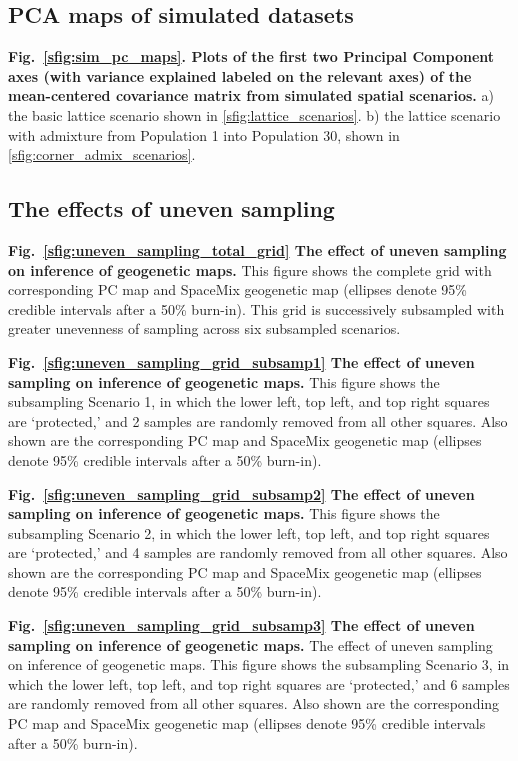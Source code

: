 \documentclass[10pt,letterpaper]{article}
\begin{document}
\subsection*{PCA maps of simulated datasets}
\label{sim_pc_maps}
{\bf{Fig.\ \ref{sfig:sim_pc_maps}. Plots of the first two Principal Component axes (with variance explained labeled on the relevant axes)
			of the mean-centered covariance matrix from simulated spatial scenarios.}}
			a) the basic lattice scenario shown in \ref{sfig:lattice_scenarios}.
			b) the lattice scenario with admixture from Population 1 into Population 30, 
				shown in \ref{sfig:corner_admix_scenarios}.

\subsection*{The effects of uneven sampling}
\label{sfig:uneven_sampling_total_grid}
{\bf{Fig.\ \ref{sfig:uneven_sampling_total_grid}}
	The effect of uneven sampling on inference of geogenetic maps.}
	This figure shows the complete grid with corresponding PC map
	and SpaceMix geogenetic map 
	(ellipses denote 95\% credible intervals after a 50\% burn-in).  
	This grid is successively subsampled with greater unevenness of
	sampling across six subsampled scenarios.
	
\label{sfig:uneven_sampling_grid_subsamp1}
{\bf{Fig.\ \ref{sfig:uneven_sampling_grid_subsamp1}}
	The effect of uneven sampling on inference of geogenetic maps.}
	This figure shows the subsampling Scenario 1, 
	in which the lower left, top left, and top right squares are `protected,'
	and 2 samples are randomly removed from all other squares.
	Also shown are the corresponding PC map and 
	SpaceMix geogenetic map 
	(ellipses denote 95\% credible intervals after a 50\% burn-in).
			
\label{sfig:uneven_sampling_grid_subsamp2}
{\bf{Fig.\ \ref{sfig:uneven_sampling_grid_subsamp2}}
	The effect of uneven sampling on inference of geogenetic maps.}
	This figure shows the subsampling Scenario 2, 
	in which the lower left, top left, and top right squares are `protected,'
	and 4 samples are randomly removed from all other squares.
	Also shown are the corresponding PC map and 
	SpaceMix geogenetic map 
	(ellipses denote 95\% credible intervals after a 50\% burn-in).
			
\label{sfig:uneven_sampling_grid_subsamp3}
{\bf{Fig.\ \ref{sfig:uneven_sampling_grid_subsamp3}}
	The effect of uneven sampling on inference of geogenetic maps.}
	The effect of uneven sampling on inference of geogenetic maps.  
	This figure shows the subsampling Scenario 3, 
	in which the lower left, top left, and top right squares are `protected,'
	and 6 samples are randomly removed from all other squares.
	Also shown are the corresponding PC map and 
	SpaceMix geogenetic map 
	(ellipses denote 95\% credible intervals after a 50\% burn-in).
	
\end{document}
